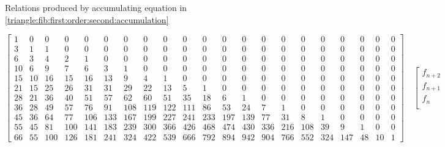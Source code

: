 \documentclass[a4paper,dottedtoc,headinclude,footinclude]{report} %
\theoremstyle{plain}
\begin{document}
\begin{table}
        \caption{Relations produced by accumulating equation in 
            \autoref{triangle:fib:first:order:second:accumulation}}
        \label{triangle:fib:first:order:third:accumulation}
    \end{table}

    \begin{table}
        \begin{displaymath}
            \left[
                \begin{array}{ccccccccccccccccccccc}
                    1 & 0 & 0 & 0 & 0 & 0 & 0 & 0 & 0 & 0 & 0 & 0 & 0 & 0 & 0 & 0 & 0 & 0 & 0 & 0 & 0\\
                    3 & 1 & 1 & 0 & 0 & 0 & 0 & 0 & 0 & 0 & 0 & 0 & 0 & 0 & 0 & 0 & 0 & 0 & 0 & 0 & 0\\
                    6 & 3 & 4 & 2 & 1 & 0 & 0 & 0 & 0 & 0 & 0 & 0 & 0 & 0 & 0 & 0 & 0 & 0 & 0 & 0 & 0\\
                    10 & 6 & 9 & 7 & 6 & 3 & 1 & 0 & 0 & 0 & 0 & 0 & 0 & 0 & 0 & 0 & 0 & 0 & 0 & 0 & 0\\
                    15 & 10 & 16 & 15 & 16 & 13 & 9 & 4 & 1 & 0 & 0 & 0 & 0 & 0 & 0 & 0 & 0 & 0 & 0 & 0 & 0\\
                    21 & 15 & 25 & 26 & 31 & 31 & 29 & 22 & 13 & 5 & 1 & 0 & 0 & 0 & 0 & 0 & 0 & 0 & 0 & 0 & 0\\
                    28 & 21 & 36 & 40 & 51 & 57 & 62 & 60 & 51 & 35 & 18 & 6 & 1 & 0 & 0 & 0 & 0 & 0 & 0 & 0 & 0\\
                    36 & 28 & 49 & 57 & 76 & 91 & 108 & 119 & 122 & 111 & 86 & 53 & 24 & 7 & 1 & 0 & 0 & 0 & 0 & 0 & 0\\
                    45 & 36 & 64 & 77 & 106 & 133 & 167 & 199 & 227 & 241 & 233 & 197 & 139 & 77 & 31 & 8 & 1 & 0 & 0 & 0 & 0\\
                    55 & 45 & 81 & 100 & 141 & 183 & 239 & 300 & 366 & 426 & 468 & 474 & 430 & 336 & 216 & 108 & 39 & 9 & 1 & 0 & 0\\
                    66 & 55 & 100 & 126 & 181 & 241 & 324 & 422 & 539 & 666 & 792 & 894 & 942 & 904 & 766 & 552 & 324 & 147 & 48 & 10 & 1
                \end{array}
                \right]  \quad %
                \left[
                    \begin{array}{c}
                        f_{n + 2}\\
                        f_{n + 1}\\
                        f_{n}\\

\end{array}
\end{displaymath}
\end{table}
\end{document}
